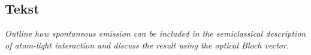 \subsection{Tekst}

\emph{Outline how spontaneous emission can be included in the semiclassical description of atom-light interaction and discuss the result using the optical Bloch vector.}